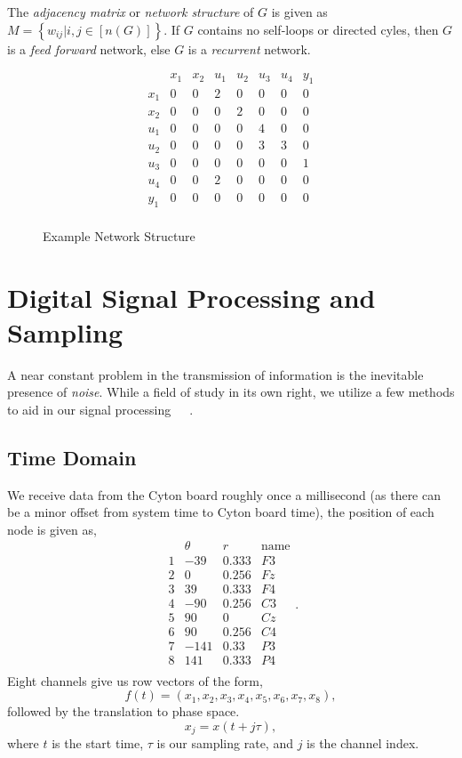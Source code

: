 \documentclass[twoside, 12pt]{article}
\theoremstyle{plain}
\begin{document}
The \textit{adjacency matrix} or \textit{network structure} of $G$ is given as $M=\left\{w_{ij}\vert i,j\in [n(G)]\right\}$. If $G$ contains no self-loops or directed cyles, then $G$ is a \textit{feed forward} network, else $G$ is a \textit{recurrent} network.
\begin{figure}
$$\begin{array}{cccccccc}
  & x_1 & x_2 & u_1 & u_2 & u_3 & u_4 & y_1 \\
 x_1 & 0 & 0 & 2 & 0 & 0 & 0 & 0 \\
 x_2 & 0 & 0 & 0 & 2 & 0 & 0 & 0 \\
 u_1 & 0 & 0 & 0 & 0 & 4 & 0 & 0 \\
 u_2 & 0 & 0 & 0 & 0 & 3 & 3 & 0 \\
 u_3 & 0 & 0 & 0 & 0 & 0 & 0 & 1 \\
 u_4 & 0 & 0 & 2 & 0 & 0 & 0 & 0 \\
 y_1 & 0 & 0 & 0 & 0 & 0 & 0 & 0 \\
  \end{array}$$
  \caption{Example Network Structure}
 \end{figure}
\section{Digital Signal Processing and Sampling}
A near constant problem in the transmission of information is the inevitable presence of \textit{noise}. While a field of study in its own right, we utilize a few methods to aid in our signal processing~\cite{orfanidis_introduction_1996-1}~\cite{ulbikas_chaos_1998}~\cite{rodriguez-bermudez_analysis_2015}.
\subsection{Time Domain}
We receive data from the Cyton board roughly once a millisecond (as there can be a minor offset from system time to Cyton board time), the position of each node is given as,
$$\begin{array}{cccc}
  & \theta & r & \text{name}\\
1 & -39 & 0.333 & F3\\
2 & 0 & 0.256 & Fz\\
3 & 39 & 0.333 & F4\\
4 & -90 & 0.256 & C3\\
5 & 90 & 0 & Cz\\
6 & 90 & 0.256 & C4\\
7 & -141 & 0.33 & P3\\
8 & 141 & 0.333 & P4\\
\end{array}.$$ Eight channels give us row vectors of the form, $$f(t) = (x_1,x_2,x_3,x_4,x_5,x_6,x_7,x_8),$$
followed by the translation to phase space.
$$x_j=x(t+j\tau),$$
where $t$ is the start time, $\tau$ is our sampling rate, and $j$ is the channel index.
\end{document}
